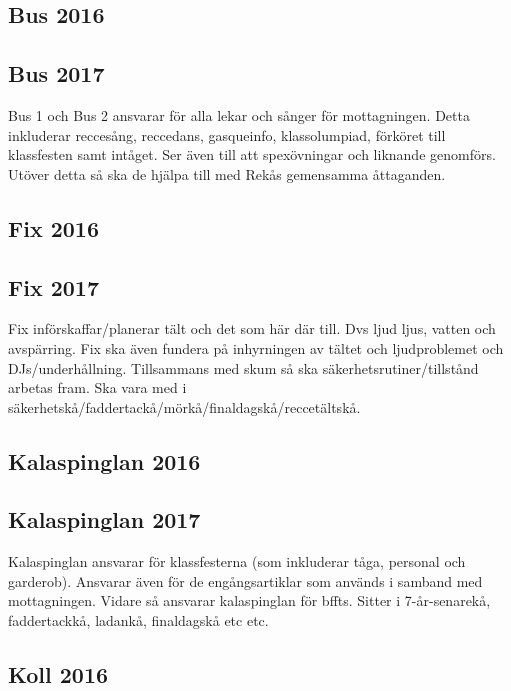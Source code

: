 \documentclass[a4paper]{article}
\begin{document}
\subsection{Bus 2016}



\subsection{Bus 2017}

Bus 1 och Bus 2 ansvarar för alla lekar och sånger för 
mottagningen. Detta inkluderar reccesång, reccedans, 
gasqueinfo, klassolumpiad, förköret till klassfesten 
samt intåget. Ser även till att spexövningar och 
liknande genomförs. Utöver detta så ska de hjälpa till 
med Rekås gemensamma åttaganden. 

\subsection{Fix 2016}



\subsection{Fix 2017}

Fix införskaffar/planerar tält och det som här där 
till. Dvs ljud ljus, vatten och avspärring. Fix ska 
även fundera på inhyrningen av tältet och 
ljudproblemet och DJs/underhållning. Tillsammans med 
skum så ska säkerhetsrutiner/tillstånd arbetas fram. 
Ska vara med i 
säkerhetskå/faddertackå/mörkå/finaldagskå/reccetältskå.  

\subsection{Kalaspinglan 2016}



\subsection{Kalaspinglan 2017}

Kalaspinglan ansvarar för klassfesterna (som 
inkluderar tåga, personal och garderob). Ansvarar även 
för de engångsartiklar som används i samband med 
mottagningen. Vidare så ansvarar kalaspinglan för 
bffts. Sitter i 7-år-senarekå, faddertackkå, ladankå, 
finaldagskå etc etc.

\subsection{Koll 2016}
\end{document}

